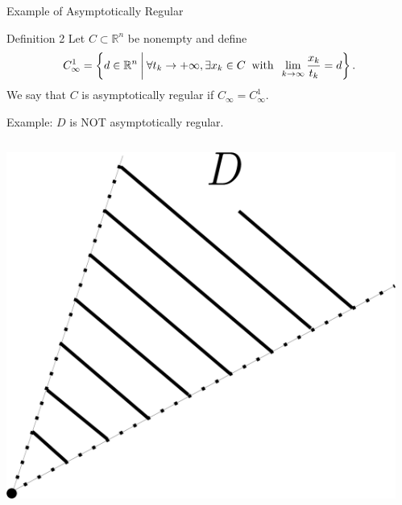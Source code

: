 \documentclass[aspectratio=169, dvipdfmx, 11pt]{beamer} %
\newcommand{\NDemenstionalRealEuclidianSpace}{\mathbb{R}^n}
\begin{document}
\begin{frame}{Example of Asymptotically Regular}
  \begin{block}{Definition 2}
    Let $C \subset \NDemenstionalRealEuclidianSpace$ be nonempty and define
    \begin{equation}
      C_{\infty}^1 = \left\{d \in \NDemenstionalRealEuclidianSpace \:\middle|\: \forall t_k \rightarrow + \infty , \exists x_k \in C \:\text{ with }\: \lim_{k \to \infty} \frac{x_k}{t_k} = d \right\}. \notag
    \end{equation}
    We say that $C$ is asymptotically regular if $C_{\infty} = C_{\infty}^1$.
  \end{block}

  Example: $D$ is NOT asymptotically regular.

  \centering
  \begin{columns}
    \begin{column}{0.48\textwidth}
    \centering
    \includegraphics[keepaspectratio, scale=0.085]{figures/example_not_asymptotically_regular_1.eps}
    \end{column}
    \pause
    \begin{column}{0.48\textwidth}
    \centering

\end{column}
\end{columns}
\end{frame}
\end{document}

